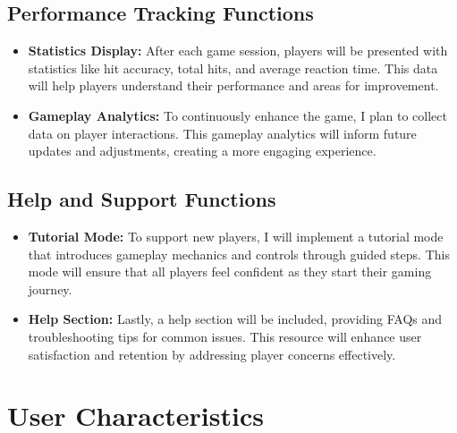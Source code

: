 \documentclass{article}
\begin{document}
\subsection{Performance Tracking Functions}
\begin{itemize}
    \item \textbf{Statistics Display:} After each game session, players will be presented with statistics like hit accuracy, total hits, and average reaction time. This data will help players understand their performance and areas for improvement.
    \item \textbf{Gameplay Analytics:} To continuously enhance the game, I plan to collect data on player interactions. This gameplay analytics will inform future updates and adjustments, creating a more engaging experience.
\end{itemize}

\subsection{Help and Support Functions}
\begin{itemize}
    \item \textbf{Tutorial Mode:} To support new players, I will implement a tutorial mode that introduces gameplay mechanics and controls through guided steps. This mode will ensure that all players feel confident as they start their gaming journey.
    \item \textbf{Help Section:} Lastly, a help section will be included, providing FAQs and troubleshooting tips for common issues. This resource will enhance user satisfaction and retention by addressing player concerns effectively.
\end{itemize}

\section{User Characteristics}
\end{document}
